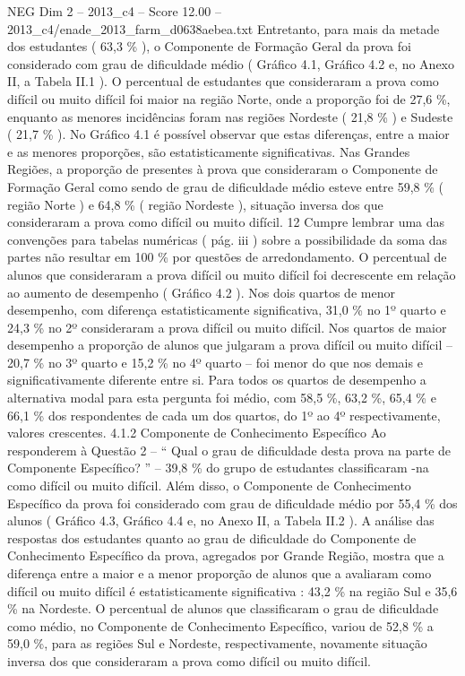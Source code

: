 \begin{textsample}{NEG Dim 2 – 2013\_c4 – Score 12.00 – 2013\_c4/enade\_2013\_farm\_d0638aebea.txt}
Entretanto, para mais da metade dos estudantes ( 63,3 \% ), o Componente de Formação Geral da prova foi considerado com grau de dificuldade médio ( Gráfico 4.1, Gráfico 4.2 e, no Anexo II, a Tabela II.1 ).
O percentual de estudantes que consideraram a prova como difícil ou muito difícil foi maior na região Norte, onde a proporção foi de 27,6 \%, enquanto as menores incidências foram nas regiões Nordeste ( 21,8 \% ) e Sudeste ( 21,7 \% ).
No Gráfico 4.1 é possível observar que estas diferenças, entre a maior e as menores proporções, são estatisticamente significativas.
Nas Grandes Regiões, a proporção de presentes à prova que consideraram o Componente de Formação Geral como sendo de grau de dificuldade médio esteve entre 59,8 \% ( região Norte ) e 64,8 \% ( região Nordeste ), situação inversa dos que consideraram a prova como difícil ou muito difícil. 12 Cumpre lembrar uma das convenções para tabelas numéricas ( pág. iii ) sobre a possibilidade da soma das partes não resultar em 100 \% por questões de arredondamento.
O percentual de alunos que consideraram a prova difícil ou muito difícil foi decrescente em relação ao aumento de desempenho ( Gráfico 4.2 ).
Nos dois quartos de menor desempenho, com diferença estatisticamente significativa, 31,0 \% no 1º quarto e 24,3 \% no 2º consideraram a prova difícil ou muito difícil.
Nos quartos de maior desempenho a proporção de alunos que julgaram a prova difícil ou muito difícil – 20,7 \% no 3º quarto e 15,2 \% no 4º quarto – foi menor do que nos demais e significativamente diferente entre si.
Para todos os quartos de desempenho a alternativa modal para esta pergunta foi médio, com 58,5 \%, 63,2 \%, 65,4 \% e 66,1 \% dos respondentes de cada um dos quartos, do 1º ao 4º respectivamente, valores crescentes. 4.1.2 Componente de Conhecimento Específico Ao responderem à Questão 2 – “ Qual o grau de dificuldade desta prova na parte de Componente Específico? ” – 39,8 \% do grupo de estudantes classificaram -na como difícil ou muito difícil.
Além disso, o Componente de Conhecimento Específico da prova foi considerado com grau de dificuldade médio por 55,4 \% dos alunos ( Gráfico 4.3, Gráfico 4.4 e, no Anexo II, a Tabela II.2 ).
A análise das respostas dos estudantes quanto ao grau de dificuldade do Componente de Conhecimento Específico da prova, agregados por Grande Região, mostra que a diferença entre a maior e a menor proporção de alunos que a avaliaram como difícil ou muito difícil é estatisticamente significativa : 43,2 \% na região Sul e 35,6 \% na Nordeste.
O percentual de alunos que classificaram o grau de dificuldade como médio, no Componente de Conhecimento Específico, variou de 52,8 \% a 59,0 \%, para as regiões Sul e Nordeste, respectivamente, novamente situação inversa dos que consideraram a prova como difícil ou muito difícil.

\end{textsample}
